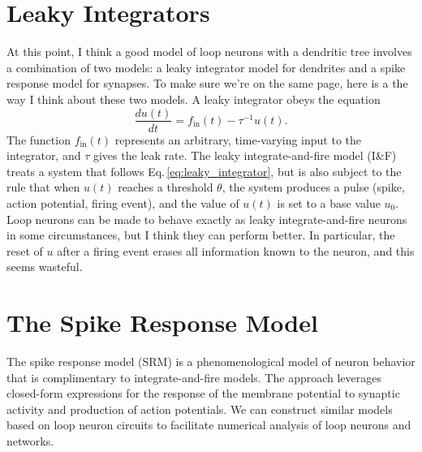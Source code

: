 \documentclass[]{article}
\begin{document}
\section{\label{sec:leaky_integrators}Leaky Integrators}
At this point, I think a good model of loop neurons with a dendritic tree involves a combination of two models: a leaky integrator model for dendrites and a spike response model for synapses. To make sure we're on the same page, here is a the way I think about these two models. A leaky integrator obeys the equation
\begin{equation}
\label{eq:leaky_integrator}
\frac{du(t)}{dt} = f_{\mathrm{in}}(t)-\tau^{-1}u(t).
\end{equation}
The function $f_{\mathrm{in}}(t)$ represents an arbitrary, time-varying input to the integrator, and $\tau$ gives the leak rate. The leaky integrate-and-fire model (I\&F) treats a system that follows Eq.\,\ref{eq:leaky_integrator}, but is also subject to the rule that when $u(t)$ reaches a threshold $\theta$, the system produces a pulse (spike, action potential, firing event), and the value of $u(t)$ is set to a base value $u_0$. Loop neurons can be made to behave exactly as leaky integrate-and-fire neurons in some circumstances, but I think they can perform better. In particular, the reset of $u$ after a firing event erases all information known to the neuron, and this seems wasteful.  

\section{\label{sec:spike_response_model}The Spike Response Model}
The spike response model (SRM) is a phenomenological model of neuron behavior that is complimentary to integrate-and-fire models. The approach leverages closed-form expressions for the response of the membrane potential to synaptic activity and production of action potentials. We can construct similar models based on loop neuron circuits to facilitate numerical analysis of loop neurons and networks.
\end{document}
